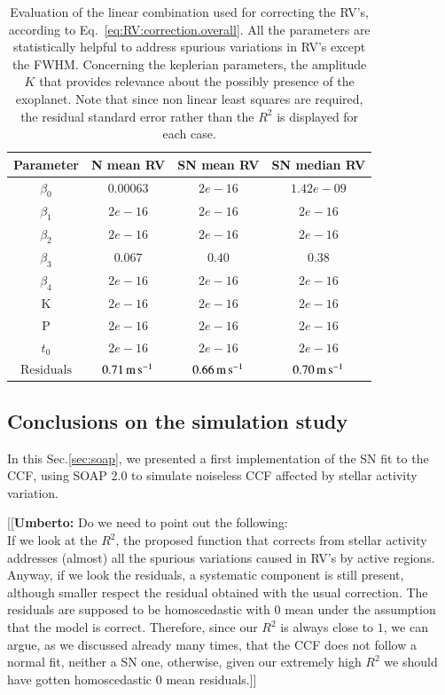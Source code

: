 \documentclass{aa}
\def\ms{\hbox{\,m\,s$^{-1}$}}         %
\newcommand{\umberto}[1]{{\color{green}[[\textbf{Umberto: }#1]]}}
\begin{document}
\begin{table}
\centering
\begin{tabular}{|c|c|c|c|}
\hline
Parameter          & N mean RV         &   SN mean RV &   SN median RV \\
\hline
$\beta_{0}$            &    $0.00063$    & $2e-16$  & $1.42e-09$ \\
\hline
$\beta_{1}$            &    $2e-16$    & $2e-16$  & $2e-16$ \\
\hline
$\beta_{2}$            &     $2e-16$   & $2e-16$ & $2e-16$\\
\hline
$\beta_{3}$            &     $0.067$   &  $0.40$  & $0.38$\\
\hline
$\beta_{4}$            &     $2e-16$   &  $2e-16$ & $2e-16$\\
\hline
K            &     $2e-16$   &  $2e-16$   & $2e-16$ \\
\hline
P            &     $2e-16$   &  $2e-16$ & $2e-16$ \\
\hline
$t_{0}$            &     $2e-16$   &  $2e-16$ & $2e-16$ \\
\hline
$\text{Residuals}$      &     $0.71 \ms$    &  $ 0.66 \ms$ & $0.70 \ms$  \\
\hline
\end{tabular}
\caption{Evaluation of the linear combination used for correcting the RV's, according to Eq.~\ref{eq:RV:correction.overall}. All the parameters are statistically helpful to address spurious variations in RV's except the FWHM. Concerning the keplerian parameters, the amplitude $K$ that provides relevance about the possibly presence of the exoplanet. Note that since non linear least squares are required, the residual standard error rather than the $R^2$ is displayed for each case.}
\label{table:spotplanet.test}
\end{table}

\subsection{Conclusions on the simulation study} \label{sec:soap.conclusions}

In this Sec.\ref{sec:soap}, we presented a first implementation of the SN fit to the CCF, using SOAP 2.0 to simulate noiseless CCF affected by stellar activity variation. 

\umberto{Do we need to point out the following: \\ If we look at the $R^2$, the proposed function that corrects from stellar activity addresses (almost) all the spurious variations caused in RV's by active regions. Anyway, if we look the residuals, a systematic component is still present, although smaller respect the residual obtained with the usual correction. The residuals are supposed to be homoscedastic with 0 mean under the assumption that the model is correct. Therefore, since our $R^2$ is always close to $1$, we can argue, as we discussed already many times, that the CCF does not follow a normal fit, neither a SN one, otherwise, given our extremely high $R^2$ we should have gotten homoscedastic 0 mean residuals.}
\end{document}
